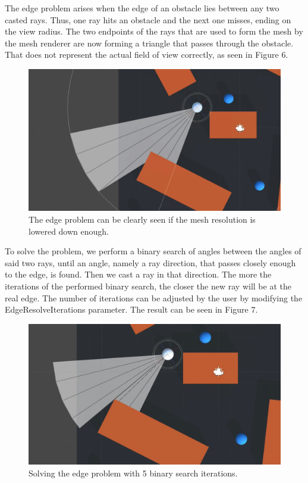 \documentclass{article}
\begin{document}
The edge problem arises when the edge of an obstacle lies between any two casted rays. Thus, one ray hits an obstacle and the next one misses, ending on the view radius. The two endpoints of the rays that are used to form the mesh by the mesh renderer are now forming a triangle that passes through the obstacle. That does not represent the actual field of view correctly, as seen in Figure 6. 

\begin{figure} %
	\centering
	\includegraphics[width=1\columnwidth]{FOV(7).png} %
	\caption{The edge problem can be clearly seen if the mesh resolution is lowered down enough.}
\end{figure}

To solve the problem, we perform a binary search of angles between the angles of said two rays, until an angle, namely a ray direction, that passes closely enough to the edge, is found. Then we cast a ray in that direction. The more the iterations of the performed binary search, the closer the new ray will be at the real edge. The number of iterations can be adjusted by the user by modifying the EdgeResolveIterations parameter. The result can be seen in Figure 7. 

\begin{figure} %
	\centering
	\includegraphics[width=1\columnwidth]{FOV(8).png} %
	\caption{Solving the edge problem with 5 binary search iterations.}
\end{figure}
\end{document}
